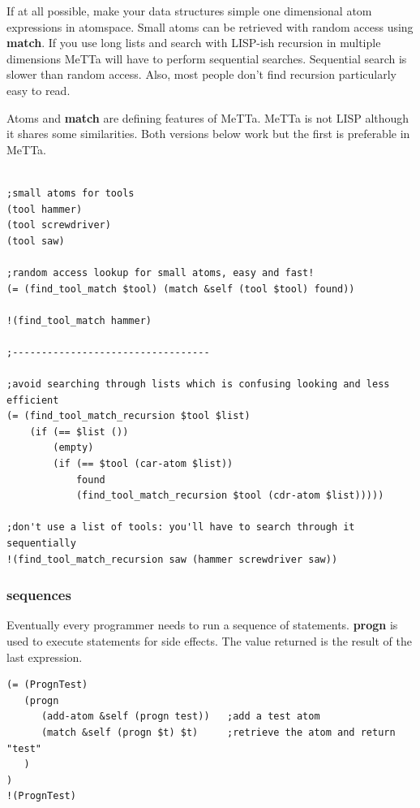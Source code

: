 \documentclass{article}
\begin{document}
If at all possible, make your data structures simple one dimensional atom expressions in atomspace. Small atoms can be retrieved with random access using \textbf{match}.  If you use long lists and search with LISP-ish recursion in multiple dimensions MeTTa will have to perform sequential searches. Sequential search is slower than random access. Also, most people don't find recursion particularly easy to read. 

Atoms and \textbf{match} are defining features of MeTTa. MeTTa is not LISP although it shares some similarities. Both versions below work but the first is preferable in MeTTa.

\begin{verbatim}

;small atoms for tools
(tool hammer)
(tool screwdriver)
(tool saw)

;random access lookup for small atoms, easy and fast!
(= (find_tool_match $tool) (match &self (tool $tool) found))

!(find_tool_match hammer)

;----------------------------------

;avoid searching through lists which is confusing looking and less efficient
(= (find_tool_match_recursion $tool $list)
    (if (== $list ())
        (empty)
        (if (== $tool (car-atom $list))
            found
            (find_tool_match_recursion $tool (cdr-atom $list)))))

;don't use a list of tools: you'll have to search through it sequentially
!(find_tool_match_recursion saw (hammer screwdriver saw))
\end{verbatim}


\subsubsection{sequences}

Eventually every programmer needs to run a sequence of statements. \textbf{progn} is used to execute statements for side effects. The value returned is the result of the last expression.

\begin{verbatim}
(= (PrognTest)
   (progn
      (add-atom &self (progn test))   ;add a test atom
      (match &self (progn $t) $t)     ;retrieve the atom and return "test"
   )
)
!(PrognTest)
\end{verbatim}
\end{document}
